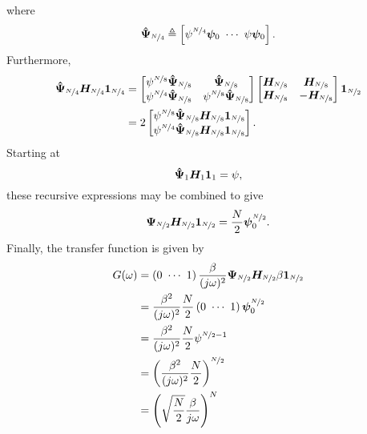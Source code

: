 where
\begin{equation}
    \bm{\hat{\Psi}}_{\nicefrac{N}{4}} \triangleq \left[\psi^{\nicefrac{N}{4}} \bm{\psi}_0 \ \cdots \  \psi \bm{\psi}_0 \right].
\end{equation}
Furthermore,
\begin{align}
    \bm{\hat{\Psi}}_{\nicefrac{N}{4}}\bm{H_}{\nicefrac{N}{4}} \bm{1}_{\nicefrac{N}{4}} & =
    \begin{bmatrix}
        \psi^{{\nicefrac{N}{8}}}\bm{\hat{\Psi}}_{\nicefrac{N}{8}} & \bm{\hat{\Psi}}_{\nicefrac{N}{8}} \\
        \psi^{{\nicefrac{N}{4}}}\bm{\hat{\Psi}}_{\nicefrac{N}{8}} & \psi^{{\nicefrac{N}{8}}}\bm{\hat{\Psi}}_{\nicefrac{N}{8}}
    \end{bmatrix}
    \begin{bmatrix}
        \bm{H_}{\nicefrac{N}{8}} & \bm{H_}{\nicefrac{N}{8}} \\
        \bm{H_}{\nicefrac{N}{8}} & -\bm{H_}{\nicefrac{N}{8}}
    \end{bmatrix}
    \bm{1}_{\nicefrac{N}{2}} \\
    & = 2
    \begin{bmatrix}
        \psi^{\nicefrac{N}{8}} \bm{\hat{\Psi}}_{\nicefrac{N}{8}}\bm{H_}{\nicefrac{N}{8}}\bm{1}_{\nicefrac{N}{8}} \\
        \psi^{\nicefrac{N}{4}} \bm{\hat{\Psi}}_{\nicefrac{N}{8}}\bm{H_}{\nicefrac{N}{8}}\bm{1}_{\nicefrac{N}{8}}
    \end{bmatrix}.
\end{align}
Starting at
\begin{equation}
    \bm{\hat{\Psi}}_{1}\bm{H_}{1} \bm{1}_{1} = \psi,
\end{equation}
these recursive expressions may be combined to give
\begin{equation}
    \label{eq:PsiHnFinal}
    \bm{\Psi}_{\nicefrac{N}{2}}\bm{H_}{\nicefrac{N}{2}} \bm{1}_{\nicefrac{N}{2}} = \frac{N}{2}\bm{\psi}_0^{\nicefrac{N}{2}}.
\end{equation}
Finally, the transfer function is given by
\begin{align}
    G(\omega) & = \left( 0 \ \cdots \ 1 \right) \frac{\beta}{(j\omega)^2}\bm{\Psi}_{\nicefrac{N}{2}}\bm{H_}{\nicefrac{N}{2}} \beta \bm{1}_{\nicefrac{N}{2}} \\
    & = \frac{\beta^2}{(j\omega)^2}\frac{N}{2} \left( 0 \ \cdots \ 1 \right) \bm{\psi}_0^{\nicefrac{N}{2}} \\
    & = \frac{\beta^2}{(j\omega)^2}\frac{N}{2} \psi^{\nicefrac{N}{2}-1} \\
    & = \left(\frac{\beta^2}{(j\omega)^2}\frac{N}{2} \right)^{\nicefrac{N}{2}} \\
    & = \left( \sqrt{\frac{N}{2}}\frac{\beta}{j\omega} \right)^N \label{eq:ATF_FINAL}
\end{align}
















